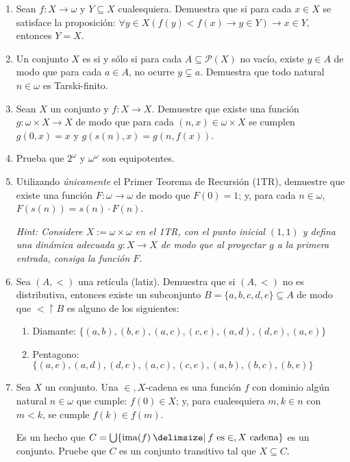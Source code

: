 \documentclass[11pt]{article}
\providecommand\st{\;|\;}
\newcommand\SetSymbol[1][]{%
    \nonscript\:#1\vert
    \allowbreak
    \nonscript\:
    \mathopen{}}
\renewcommand\st{\SetSymbol[\delimsize]}
\renewcommand\st{\SetSymbol[\delimsize]}
\newcommand{\ms}[1]{\mathscr{#1}}
\DeclareMathOperator{\ima}{ima}
\begin{document}
\begin{enumerate}[\bf\text{Ej.} 1.]
    \item Sean $f:X\to \omega$ y $Y\subseteq X$ cualesquiera. Demuestra que si para cada $x\in X$ se satisface la proposición: $\forall y\in X (f(y)<f(x) \to y\in Y) \to x\in Y$, entonces $Y=X$.

    \item Un conjunto $X$ es  si y sólo si para cada $A \subseteq \ms{P}(X)$ no vacío, existe $y \in A$ de modo que para cada $a \in A$, no ocurre $y \subsetneq a$. Demuestra que todo natural $n \in \omega$ es Tarski-finito.

    \item Sean $X$ un conjunto y $f:X \to X$. Demuestre que existe una función $g:\omega \times X \to X$ de modo que para cada $(n,x) \in \omega \times X$ se cumplen $g(0,x)=x$ y $g(s(n),x)=g(n,f(x))$.

    \item Prueba que $2^\omega$ y $\omega ^ \omega$ son equipotentes.

    \item Utilizando \textit{únicamente} el Primer Teorema de Recursión (1TR), demuestre que existe una función $F:\omega \to \omega$ de modo que $F(0)=1$; y, para cada $n \in \omega$, $F(s(n))=s(n) \cdot F(n)$.
    
    \hfill \textit{Hint: Considere $X:=\omega \times \omega$ en el 1TR, con el punto inicial $(1,1)$ y defina una dinámica adecuada $g:X \to X$ de modo que al proyectar $g$ a la primera entrada, consiga la función $F$.}
    
    \item Sea $(A,<)$ una retícula (latiz). Demuestra que si $(A,<)$ no es distributiva, entonces existe un subconjunto $B=\{a,b,c,d,e\} \subseteq A$ de modo que $< \upharpoonright B$ es alguno de los siguientes:
    \begin{enumerate}
        \item Diamante: $\{(a,b),(b,e),(a,c),(c,e),(a,d),(d,e),(a,e)\}$
        \item Pentagono: $\{(a,e),(a,d),(d,e),(a,c),(c,e),(a,b),(b,c),(b,e)\}$
    \end{enumerate}
    
    \item Sea $X$ un conjunto. Una $\in,X$-cadena es una función $f$ con dominio algún natural $n \in \omega$ que cumple: $f(0) \in X$; y, para cualesquiera $m,k \in n$ con $m<k$, se cumple $f(k) \in f(m)$. 
    
    Es un hecho que $C=\bigcup \{ \ima(f) \st f \text{ es} \in,X \text{ cadena}\}$ es un conjunto. Pruebe que $C$ es un conjunto transitivo tal que $X \subseteq C$.
    
    \end{enumerate}  
\end{document}
